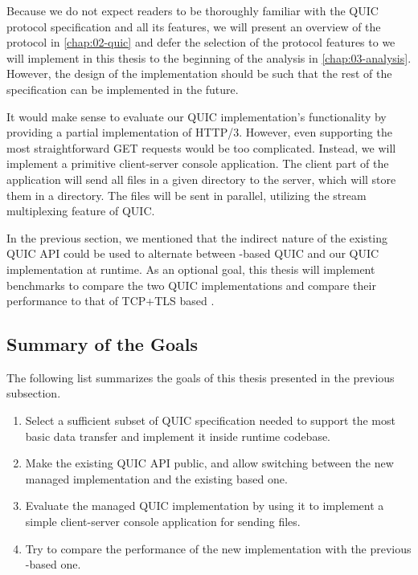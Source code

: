 Because we do not expect readers to be thoroughly familiar with the QUIC protocol specification and
all its features, we will present an overview of the protocol in \autoref{chap:02-quic} and
defer the selection of the protocol features to we will implement in this thesis to the beginning of
the analysis in \autoref{chap:03-analysis}. However, the design of the implementation should be
such that the rest of the specification can be implemented in the future.

It would make sense to evaluate our QUIC implementation's functionality by providing a partial
implementation of HTTP/3. However, even supporting the most straightforward GET requests would be
too complicated. Instead, we will implement a primitive client-server console application. The
client part of the application will send all files in a given directory to the server, which will
store them in a directory. The files will be sent in parallel, utilizing the stream multiplexing
feature of QUIC\@.

In the previous section, we mentioned that the indirect nature of the existing QUIC API could be
used to alternate between \libmsquic{}-based QUIC and our QUIC implementation at runtime. As an
optional goal, this thesis will implement benchmarks to compare the two QUIC implementations and
compare their performance to that of TCP+TLS based .

\subsection*{Summary of the Goals}


The following list summarizes the goals of this thesis presented in the previous subsection.

\begin{enumerate}

  \item Select a sufficient subset of QUIC specification needed to support the most basic data
    transfer and implement it inside \dotnet{} runtime codebase. 

  \item Make the existing QUIC API public, and allow switching between the new managed
    implementation and the existing \libmsquic{} based one. 

  \item Evaluate the managed QUIC implementation by using it to implement a simple client-server
    console application for sending files.

  \item {} Try to compare the performance of the new
    implementation with the previous \libmsquic{}-based one.

\end{enumerate}
